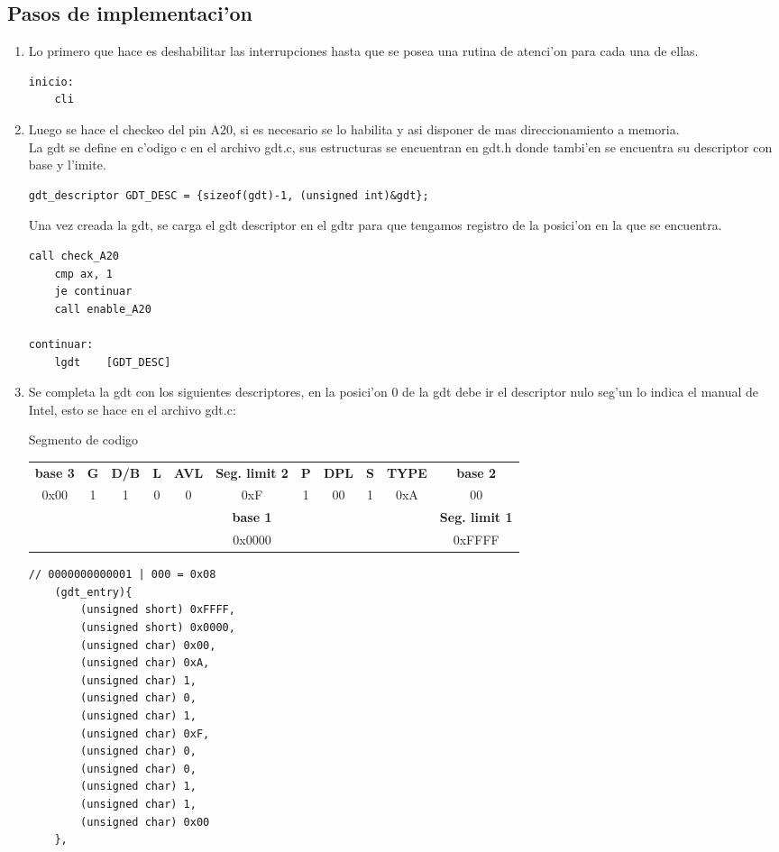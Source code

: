 \documentclass[11pt]{article}
\begin{document}
\subsection{Pasos de implementaci'on}
\begin{enumerate}
\item Lo primero que hace es deshabilitar las interrupciones hasta que se posea una rutina de atenci'on para cada una de ellas.
\begin{lstlisting}[frame=single]
inicio:
	cli
\end{lstlisting}
\item 
Luego se hace el checkeo del pin A20, si es necesario se lo habilita y asi disponer de mas direccionamiento a memoria. \\ La gdt se define en c'odigo c en el archivo gdt.c, sus estructuras se encuentran en gdt.h donde tambi'en se encuentra su descriptor con base y l'imite.
\begin{lstlisting}[frame=single]
gdt_descriptor GDT_DESC = {sizeof(gdt)-1, (unsigned int)&gdt};
\end{lstlisting}
Una vez creada la gdt, se carga el gdt descriptor en el gdtr para que tengamos registro de la posici'on en la que se encuentra.
\begin{lstlisting}[frame=single]
	call check_A20	
 	cmp ax, 1
 	je continuar
	call enable_A20	

continuar:
	lgdt	[GDT_DESC]
\end{lstlisting}

\item Se completa la gdt con los siguientes descriptores, en la posici'on 0 de la gdt debe ir el descriptor nulo seg'un lo indica el manual de Intel, esto se hace en el archivo gdt.c:

\begin{center} Segmento de codigo
\begin{tabular}[t]{|c c c c c c|c c c c c|}
\hline
\textbf{base 3} & \textbf{G} & \textbf{D/B} & \textbf{L} & \textbf{AVL} & \textbf{Seg. limit 2} & \textbf{P} & \textbf{DPL} & \textbf{S} & \textbf{TYPE} & \textbf{base 2} \\
0x00 & 1 & 1 & 0 & 0 & 0xF & 1 & 00 & 1 & 0xA & 00 \\
\hline
& & & & & \textbf{base 1} & & & & & \textbf{Seg. limit 1} \\
& & & & & 0x0000 & & & & & 0xFFFF  \\
\hline
\end{tabular}
\end{center}
\begin{lstlisting}[frame=single]
// 0000000000001 | 000 = 0x08
	(gdt_entry){ 
		(unsigned short) 0xFFFF, 
		(unsigned short) 0x0000,
		(unsigned char) 0x00, 
		(unsigned char) 0xA, 
		(unsigned char) 1, 
		(unsigned char) 0, 
		(unsigned char) 1, 
		(unsigned char) 0xF,
		(unsigned char) 0,  
		(unsigned char) 0,  
		(unsigned char) 1,  
		(unsigned char) 1, 
		(unsigned char) 0x00 
	},
\end{lstlisting}


\end{enumerate}
\end{document}
